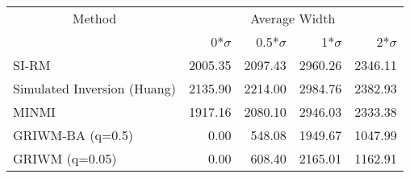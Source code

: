 
\begin{tabular}{lrrrr}
\toprule
\multicolumn{1}{c}{Method} & \multicolumn{4}{c}{Average Width} \\
 & 0*$\sigma$ & 0.5*$\sigma$ & 1*$\sigma$ & 2*$\sigma$\\
\midrule
SI-RM & 2005.35 & 2097.43 & 2960.26 & 2346.11\\
Simulated Inversion (Huang) & 2135.90 & 2214.00 & 2984.76 & 2382.93\\
MINMI & 1917.16 & 2080.10 & 2946.03 & 2333.38\\
GRIWM-BA (q=0.5) & 0.00 & 548.08 & 1949.67 & 1047.99\\
GRIWM (q=0.05) & 0.00 & 608.40 & 2165.01 & 1162.91\\
\bottomrule
\end{tabular}
